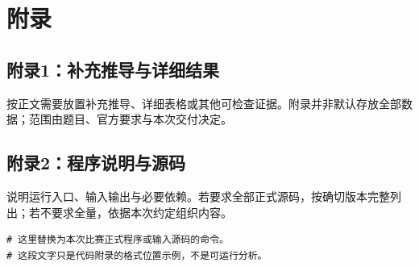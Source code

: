 \FloatBarrier
\clearpage
\section{附录}
\renewcommand{\thefigure}{A\arabic{figure}}\setcounter{figure}{0}
\renewcommand{\thetable}{A\arabic{table}}\setcounter{table}{0}
\subsection*{附录1：补充推导与详细结果}
按正文需要放置补充推导、详细表格或其他可检查证据。附录并非默认存放全部数据；范围由题目、官方要求与本次交付决定。

\subsection*{附录2：程序说明与源码}
说明运行入口、输入输出与必要依赖。若要求全部正式源码，按确切版本完整列出；若不要求全量，依据本次约定组织内容。
\begin{Verbatim}[fontsize=\small,breaklines=true,breakanywhere=true]
# 这里替换为本次比赛正式程序或输入源码的命令。
# 这段文字只是代码附录的格式位置示例，不是可运行分析。
\end{Verbatim}
